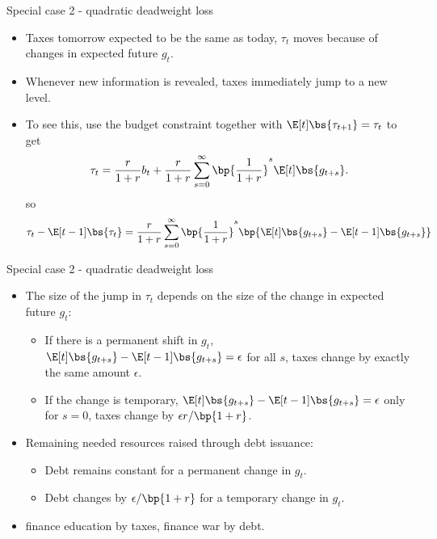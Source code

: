 \documentclass[11pt,xcolor={dvipsnames},hyperref={pdftex,pdfpagemode=UseNone,hidelinks,pdfdisplaydoctitle=true},usepdftitle=false]{beamer}
\begin{document}
    
    \begin{frame}{Special case 2 - quadratic deadweight loss}
    
    \begin{itemize}
    \item Taxes tomorrow expected to be the same as today, $\tau_t$ moves  because of changes in expected future $g_t$.
    \item Whenever new information is revealed, taxes immediately jump to a new level.
    \item To see this, use the budget constraint together with $\E[t]\bs{\tau_{t+1}} = \tau_t$ to get 
    \[ \tau_{t}=\frac{r}{1+r}b_{t}+\frac{r}{1+r}\sum_{s=0}^{\infty}\bp{\frac{1}{1+r}}^{s}\E[t]\bs{g_{t+s}}. \]
    so \[ \tau_t - \E[t-1]\bs{\tau_t} =\frac{r}{1+r}\sum_{s=0}^{\infty}\bp{\frac{1}{1+r}}^{s}\bp{\E[t]\bs{g_{t+s}}-\E[t-1]\bs{g_{t+s}}} \]
    \end{itemize}
    \end{frame}
    \begin{frame}{Special case 2 - quadratic deadweight loss}
    
    \begin{itemize}
    \item The size of the jump in $\tau_t$ depends on the size of the change in expected future $g_t$:
    \begin{itemize} 
        \item If there is a permanent shift in $g_t$, $\E[t]\bs{g_{t+s}}-\E[t-1]\bs{g_{t+s}}=\epsilon$ for all $s$, taxes change by exactly the same amount $\epsilon$.
        \item If the change is temporary, $\E[t]\bs{g_{t+s}}-\E[t-1]\bs{g_{t+s}}=\epsilon$ only for $s=0$, taxes change by $\epsilon r \slash \bp{1+r}$.
    \end{itemize}
    \item Remaining needed resources raised through debt issuance:
    \begin{itemize}
        \item Debt remains constant for a permanent change in $g_t$.
        \item Debt changes by $\epsilon \slash \bp{1+r}$ for a temporary change in $g_t$.
    \end{itemize}

    \item {} finance education by taxes, finance war by debt.
    \end{itemize}
    \end{frame}
\end{document}
